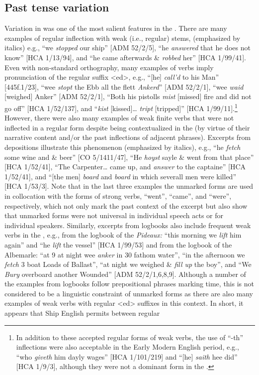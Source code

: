 \subsection{{Past tense variation} }\label{sec:6.2.2}

Variation in  was one of the most salient features in the . There are many examples of regular inflection with weak (i.e., regular)  stems, (emphasized by italics) e.g., “we \textit{stopped} our ship” [ADM 52/2/5], “he \textit{answered} that he does not know” [HCA 1/13/94], and “he came afterwards \&  \textit{robbed} her” [HCA 1/99/41]. Even with non-standard orthography, many examples of verbs imply pronunciation of the regular  suffix <ed>, e.g., “[he] \textit{call’d} to his Man” [445f.1/23], “wee \textit{stopt} the Ebb all the flett \textit{Ankerd}” [ADM 52/2/1], “wee \textit{waid} [weighed] Anker” [ADM 52/2/1], “Both his pistolls \textit{mist} [missed] fire and did not go off” [HCA 1/52/137], and “\textit{kist} [kissed]… \textit{tript} [tripped]” [HCA 1/99/11].\footnote{In addition to these accepted regular forms of  weak verbs, the use of “-th” inflections were also acceptable in the Early Modern English period, e.g., “who \textit{giveth} him dayly wages” [HCA 1/101/219] and “[he] \textit{saith} hee did” [HCA 1/9/3], although they were not a dominant form in the .} However, there were also many examples of weak finite verbs that were not inflected in a regular  form despite being contextualized in the  (by virtue of their narrative content and/or the past inflections of adjacent  phrases). Excerpts from depositions illustrate this phenomenon (emphasized by italics), e.g., “he \textit{fetch} some wine and \& beer” [CO 5/1411/47], “He \textit{hoyst} sayle \& went from that place” [HCA 1/52/41], “The Carpenter… came up, and \textit{answer} to the captaine” [HCA 1/52/41], and “[the men] \textit{board} and \textit{board} in which severall men were killed” [HCA 1/53/3]. Note that in the last three examples the unmarked forms are used in collocation with the  forms of strong verbs, “went”, “came”, and “were”, respectively, which not only mark the past context of the excerpt but also show that unmarked forms were not universal in individual speech acts or for individual speakers. Similarly, excerpts from logbooks also include frequent  weak verbs in the , e.g., from the logbook of the \textit{Pideaux:} “this morning we \textit{lift} him again” and “he \textit{lift} the vessel” [HCA 1/99/53] and from the logbook of the Albemarle: “at 9 at night wee \textit{anker} in 30 fathom water”, “in the afternoon we \textit{fetch} 3 boat Loads of Ballast”, “at night we weighed \& \textit{fill up} the boy”, and “We \textit{Bury} overboard another Wounded” [ADM 52/2/1,6,8,9]. Although a number of the examples from logbooks follow prepositional phrases marking time, this is not considered to be a linguistic constraint of unmarked  forms as there are also many examples of weak verbs with regular <ed> suffixes in this context. In short, it appears that Ship English permits  between regular 